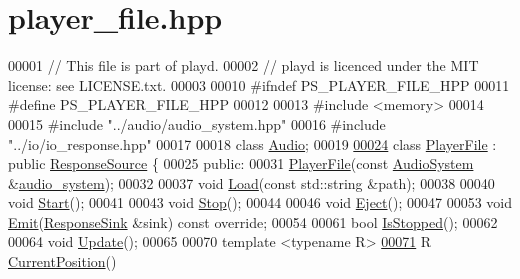 \hypertarget{player__file_8hpp_source}{\section{player\+\_\+file.\+hpp}
\label{player__file_8hpp_source}
}

\begin{DoxyCode}
00001 \textcolor{comment}{// This file is part of playd.}
00002 \textcolor{comment}{// playd is licenced under the MIT license: see LICENSE.txt.}
00003 
00010 \textcolor{preprocessor}{#ifndef PS\_PLAYER\_FILE\_HPP}
00011 \textcolor{preprocessor}{#define PS\_PLAYER\_FILE\_HPP}
00012 
00013 \textcolor{preprocessor}{#include <memory>}
00014 
00015 \textcolor{preprocessor}{#include "../audio/audio\_system.hpp"}
00016 \textcolor{preprocessor}{#include "../io/io\_response.hpp"}
00017 
00018 \textcolor{keyword}{class }\hyperlink{classAudio}{Audio};
00019 
\hypertarget{player__file_8hpp_source_l00024}{}\hyperlink{classPlayerFile}{00024} \textcolor{keyword}{class }\hyperlink{classPlayerFile}{PlayerFile} : \textcolor{keyword}{public} \hyperlink{classResponseSource}{ResponseSource} \{
00025 \textcolor{keyword}{public}:
00031     \hyperlink{classPlayerFile_a655a5bf6903cad650c0dc4e33a7e41a5}{PlayerFile}(\textcolor{keyword}{const} \hyperlink{classAudioSystem}{AudioSystem} &\hyperlink{classPlayerFile_a8de47bcb924e2c3e10b208a09eb3f05b}{audio\_system});
00032 
00037     \textcolor{keywordtype}{void} \hyperlink{classPlayerFile_a92dd004d4ab034bf41f7d5c76847d3c2}{Load}(\textcolor{keyword}{const} std::string &path);
00038 
00040     \textcolor{keywordtype}{void} \hyperlink{classPlayerFile_a426f8ad29efd5e16ac7963354087d070}{Start}();
00041 
00043     \textcolor{keywordtype}{void} \hyperlink{classPlayerFile_afd4313009b5d51df0df5dc7b59ffcf13}{Stop}();
00044 
00046     \textcolor{keywordtype}{void} \hyperlink{classPlayerFile_a394b2e7b4f4d0baee4ff1928a36e9945}{Eject}();
00047 
00053     \textcolor{keywordtype}{void} \hyperlink{classPlayerFile_a00f044c74d07d778532953a917c24197}{Emit}(\hyperlink{classResponseSink}{ResponseSink} &sink) \textcolor{keyword}{const override};
00054 
00061     \textcolor{keywordtype}{bool} \hyperlink{classPlayerFile_a43d903e65213d3a6b2c8b38924c83c5f}{IsStopped}();
00062 
00064     \textcolor{keywordtype}{void} \hyperlink{classPlayerFile_afe0b43a6980e548a6faa87f84d22d65b}{Update}();
00065 
00070     \textcolor{keyword}{template} <\textcolor{keyword}{typename} R>
\hypertarget{player__file_8hpp_source_l00071}{}\hyperlink{classPlayerFile_a072d9788c1449e0e2de3e28b169f2c34}{00071}     R \hyperlink{classPlayerFile_a072d9788c1449e0e2de3e28b169f2c34}{CurrentPosition}()

\end{DoxyCode}
